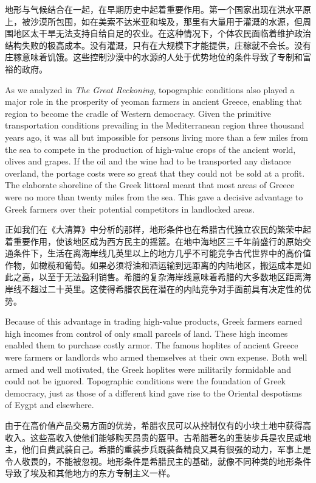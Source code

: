 \begin{Parallel}{97mm}{45mm}
  \ParallelRText
  {地形与气候结合在一起，在早期历史中起着重要作用。第一个国家出现在洪水平原上，被沙漠所包围，如在美索不达米亚和埃及，那里有大量用于灌溉的水源，但周围地区太干旱无法支持自给自足的农业。在这种情况下，个体农民面临着维护政治结构失败的极高成本。没有灌溉，只有在大规模下才能提供，庄稼就不会长。没有庄稼意味着饥饿。这些控制沙漠中的水源的人处于优势地位的条件导致了专制和富裕的政府。}
  \ParallelPar


  \ParallelLText
  {As we analyzed in \emph{The Great Reckoning}, topographic conditions also played a major role in the prosperity of yeoman farmers in ancient Greece, enabling that region to become the cradle of Western democracy. Given the primitive transportation conditions prevailing in the Mediterranean region three thousand years ago, it was all but impossible for persons living more than a few miles from the sea to compete in the production of high-value crops of the ancient world, olives and grapes. If the oil and the wine had to be transported any distance overland, the portage costs were so great that they could not be sold at a profit. The elaborate shoreline of the Greek littoral meant that most areas of Greece were no more than twenty miles from the sea. This gave a decisive advantage to Greek farmers over their potential competitors in landlocked areas.}
  
  \ParallelRText
  {正如我们在《大清算》中分析的那样，地形条件也在希腊古代独立农民的繁荣中起着重要作用，使该地区成为西方民主的摇篮。在地中海地区三千年前盛行的原始交通条件下，生活在离海岸线几英里以上的地方几乎不可能竞争古代世界中的高价值作物，如橄榄和葡萄。如果必须将油和酒运输到远距离的内陆地区，搬运成本是如此之高，以至于无法盈利销售。希腊的复杂海岸线意味着希腊的大多数地区距离海岸线不超过二十英里。这使得希腊农民在潜在的内陆竞争对手面前具有决定性的优势。}
  \ParallelPar


  \ParallelLText
  {Because of this advantage in trading high-value products, Greek farmers earned high incomes from control of only small parcels of land. These high incomes enabled them to purchase costly armor. The famous hoplites of ancient Greece were farmers or landlords who armed themselves at their own expense. Both well armed and well motivated, the Greek hoplites were militarily formidable and could not be ignored. Topographic conditions were the foundation of Greek democracy, just as those of a different kind gave rise to the Oriental despotisms of Eygpt and elsewhere.}
  
  \ParallelRText
  {由于在高价值产品交易方面的优势，希腊农民可以从控制仅有的小块土地中获得高收入。这些高收入使他们能够购买昂贵的盔甲。古希腊著名的重装步兵是农民或地主，他们自费武装自己。希腊的重装步兵既装备精良又具有很强的动力，军事上是令人敬畏的，不能被忽视。地形条件是希腊民主的基础，就像不同种类的地形条件导致了埃及和其他地方的东方专制主义一样。}
  \ParallelPar



\end{Parallel}
